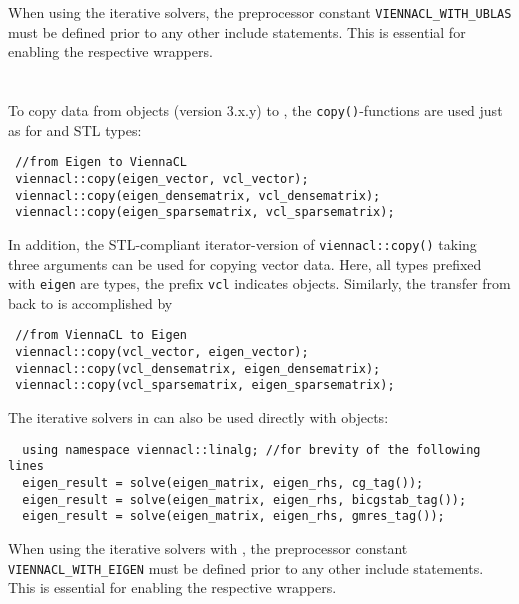 When using the iterative solvers, the preprocessor constant \texttt{VIENNACL\_WITH\_UBLAS} must be defined prior to any other {\ViennaCL} include statements.
This is essential for enabling the respective wrappers.


\section{\Eigen}
To copy data from {\Eigen} \cite{eigen} objects (version 3.x.y) to {\ViennaCL}, the \texttt{copy()}-functions are used just as for {\ublas} and STL types:
\begin{lstlisting}
 //from Eigen to ViennaCL
 viennacl::copy(eigen_vector, vcl_vector);
 viennacl::copy(eigen_densematrix, vcl_densematrix);
 viennacl::copy(eigen_sparsematrix, vcl_sparsematrix);
\end{lstlisting}
In addition, the STL-compliant iterator-version of \texttt{viennacl::copy()} taking three arguments can be used for copying vector data.
Here, all types prefixed with \texttt{eigen} are {\Eigen} types, the prefix \texttt{vcl} indicates {\ViennaCL} objects.
Similarly, the transfer from {\ViennaCL} back to {\Eigen} is accomplished by
\begin{lstlisting}
 //from ViennaCL to Eigen
 viennacl::copy(vcl_vector, eigen_vector);
 viennacl::copy(vcl_densematrix, eigen_densematrix);
 viennacl::copy(vcl_sparsematrix, eigen_sparsematrix);
\end{lstlisting}

The iterative solvers in {\ViennaCL} can also be used directly with {\Eigen} objects:
\begin{lstlisting}
  using namespace viennacl::linalg; //for brevity of the following lines
  eigen_result = solve(eigen_matrix, eigen_rhs, cg_tag());
  eigen_result = solve(eigen_matrix, eigen_rhs, bicgstab_tag());
  eigen_result = solve(eigen_matrix, eigen_rhs, gmres_tag());
\end{lstlisting}
When using the iterative solvers with {\Eigen}, the preprocessor constant \texttt{VIENNACL\_WITH\_EIGEN} must be defined prior to any other {\ViennaCL} include statements.
This is essential for enabling the respective wrappers.




